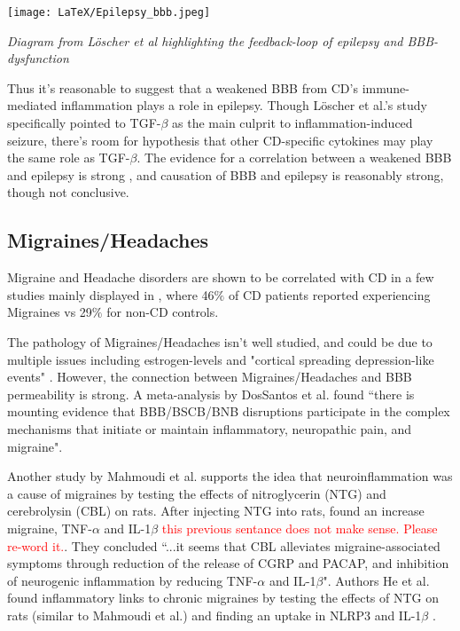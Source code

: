\documentclass{article}
\begin{document}
\texttt{[image: LaTeX/Epilepsy\_bbb.jpeg]}

\textit{Diagram from Löscher et al highlighting the feedback-loop of epilepsy and BBB-dysfunction}

Thus it's reasonable to suggest that a weakened BBB from CD's immune-mediated inflammation plays a role in epilepsy. Though Löscher et al.'s study specifically pointed to TGF-$\beta$ as the main culprit to inflammation-induced seizure, there's room for hypothesis that other CD-specific cytokines may play the same role as TGF-$\beta$.  The evidence for a correlation between a weakened BBB and epilepsy is strong \cite{Loscher} \cite{Janigro}, and causation of BBB and epilepsy is reasonably strong, though not conclusive.

\subsection{Migraines/Headaches}

Migraine and Headache disorders are shown to be correlated with CD in a few studies mainly displayed in \cite{Cicarelli}, where 46$\%$ of CD patients reported experiencing Migraines vs 29$\%$ for non-CD controls. 

The pathology of Migraines/Headaches isn't well studied, and could be due to multiple issues including estrogen-levels \cite{Chai} and "cortical spreading depression-like events" \cite{Dodick}. However, the connection between Migraines/Headaches and BBB permeability is strong. A meta-analysis by DosSantos et al. found ``there is mounting evidence that BBB/BSCB/BNB disruptions participate in the complex mechanisms that initiate or maintain inflammatory, neuropathic pain, and migraine"\cite{DosSantos}. 

Another study by Mahmoudi et al. supports the idea that neuroinflammation was a cause of migraines by testing the effects of nitroglycerin (NTG) and cerebrolysin (CBL) on rats. After injecting NTG into rats, found an increase migraine, TNF-$\alpha$ and IL-1$\beta$ \cite{Mahmoudi} \textcolor{red}{this previous sentance does not make sense. Please re-word it.}. They concluded ``...it seems that CBL alleviates migraine-associated symptoms through reduction of the release of CGRP and PACAP, and inhibition of neurogenic inflammation by reducing TNF-$\alpha$ and IL-1$\beta$"\cite{Mahmoudi}. Authors He et al. found inflammatory links to chronic migraines by testing the effects of NTG on rats (similar to Mahmoudi et al.) and finding an uptake in NLRP3 and IL-1$\beta$ \cite{He}.
\end{document}
